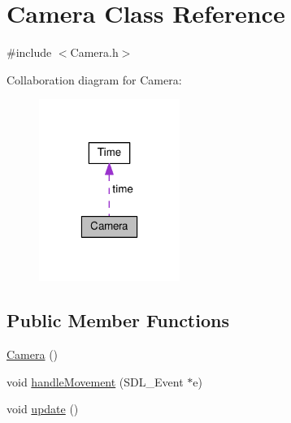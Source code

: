 \hypertarget{class_camera}{}\section{Camera Class Reference}
\label{class_camera}


{\ttfamily \#include $<$Camera.\+h$>$}



Collaboration diagram for Camera\+:\nopagebreak
\begin{figure}[H]
\begin{center}
\leavevmode
\includegraphics[width=130pt]{class_camera__coll__graph}
\end{center}
\end{figure}
\subsection*{Public Member Functions}
\begin{DoxyCompactItemize}
\item 
\hyperlink{class_camera_a01f94c3543f56ede7af49dc778f19331}{Camera} ()
\item 
void \hyperlink{class_camera_a6ca725d7a02cc423d220a849140fc0aa}{handle\+Movement} (S\+D\+L\+\_\+\+Event $\ast$e)
\item 
void \hyperlink{class_camera_a42cda7239981a5618660d04bd5893556}{update} ()
\end{DoxyCompactItemize}
